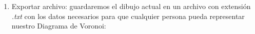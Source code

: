 \begin{enumerate}
\begin{enumerate}
            \item Exportar archivo: guardaremos el dibujo actual en un archivo con extensión \textit{.txt} con los datos necesarios para que cualquier persona pueda representar nuestro Diagrama de Voronoi:            
            \begin{figure}[H]
                \begin{center}

\end{center}
\end{figure}
\end{enumerate}
\end{enumerate}
